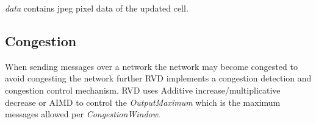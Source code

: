 \documentclass{article}
\begin{document}
    \emph{data} contains jpeg pixel data of the updated cell.

    \subsection{Congestion}

    When sending messages over a network the network may become congested to avoid congesting the network further RVD
    implements a congestion detection and congestion control mechanism. RVD uses Additive increase/multiplicative
    decrease or AIMD to control the \emph{OutputMaximum} which is the maximum messages allowed per
    \emph{CongestionWindow}.

%
\end{document}
